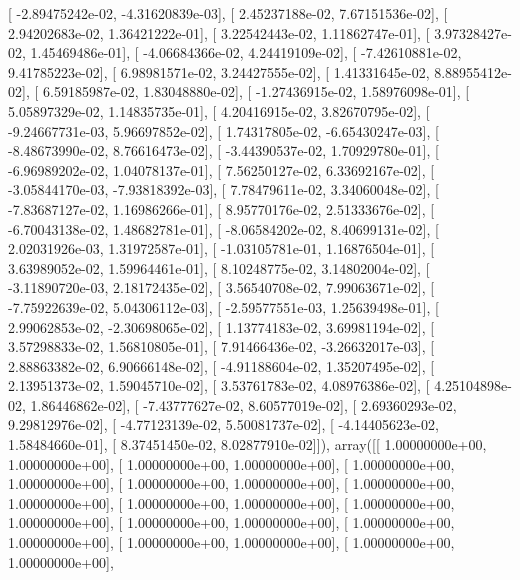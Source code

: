 \documentclass{article}
\begin{document}
       [ -2.89475242e-02,  -4.31620839e-03],
       [  2.45237188e-02,   7.67151536e-02],
       [  2.94202683e-02,   1.36421222e-01],
       [  3.22542443e-02,   1.11862747e-01],
       [  3.97328427e-02,   1.45469486e-01],
       [ -4.06684366e-02,   4.24419109e-02],
       [ -7.42610881e-02,   9.41785223e-02],
       [  6.98981571e-02,   3.24427555e-02],
       [  1.41331645e-02,   8.88955412e-02],
       [  6.59185987e-02,   1.83048880e-02],
       [ -1.27436915e-02,   1.58976098e-01],
       [  5.05897329e-02,   1.14835735e-01],
       [  4.20416915e-02,   3.82670795e-02],
       [ -9.24667731e-03,   5.96697852e-02],
       [  1.74317805e-02,  -6.65430247e-03],
       [ -8.48673990e-02,   8.76616473e-02],
       [ -3.44390537e-02,   1.70929780e-01],
       [ -6.96989202e-02,   1.04078137e-01],
       [  7.56250127e-02,   6.33692167e-02],
       [ -3.05844170e-03,  -7.93818392e-03],
       [  7.78479611e-02,   3.34060048e-02],
       [ -7.83687127e-02,   1.16986266e-01],
       [  8.95770176e-02,   2.51333676e-02],
       [ -6.70043138e-02,   1.48682781e-01],
       [ -8.06584202e-02,   8.40699131e-02],
       [  2.02031926e-03,   1.31972587e-01],
       [ -1.03105781e-01,   1.16876504e-01],
       [  3.63989052e-02,   1.59964461e-01],
       [  8.10248775e-02,   3.14802004e-02],
       [ -3.11890720e-03,   2.18172435e-02],
       [  3.56540708e-02,   7.99063671e-02],
       [ -7.75922639e-02,   5.04306112e-03],
       [ -2.59577551e-03,   1.25639498e-01],
       [  2.99062853e-02,  -2.30698065e-02],
       [  1.13774183e-02,   3.69981194e-02],
       [  3.57298833e-02,   1.56810805e-01],
       [  7.91466436e-02,  -3.26632017e-03],
       [  2.88863382e-02,   6.90666148e-02],
       [ -4.91188604e-02,   1.35207495e-02],
       [  2.13951373e-02,   1.59045710e-02],
       [  3.53761783e-02,   4.08976386e-02],
       [  4.25104898e-02,   1.86446862e-02],
       [ -7.43777627e-02,   8.60577019e-02],
       [  2.69360293e-02,   9.29812976e-02],
       [ -4.77123139e-02,   5.50081737e-02],
       [ -4.14405623e-02,   1.58484660e-01],
       [  8.37451450e-02,   8.02877910e-02]]), array([[  1.00000000e+00,   1.00000000e+00],
       [  1.00000000e+00,   1.00000000e+00],
       [  1.00000000e+00,   1.00000000e+00],
       [  1.00000000e+00,   1.00000000e+00],
       [  1.00000000e+00,   1.00000000e+00],
       [  1.00000000e+00,   1.00000000e+00],
       [  1.00000000e+00,   1.00000000e+00],
       [  1.00000000e+00,   1.00000000e+00],
       [  1.00000000e+00,   1.00000000e+00],
       [  1.00000000e+00,   1.00000000e+00],
       [  1.00000000e+00,   1.00000000e+00],
\end{document}
